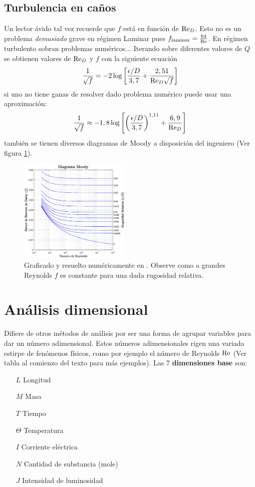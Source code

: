 \subsection{Turbulencia en caños}
Un lector ávido tal vez recuerde que $f$ está en función de $\textrm{Re}_D$. Esto no es un problema \textit{demasiado} grave en régimen Laminar pues $f_{\textrm{laminar}}=\frac{64}{\textrm{Re}}$. En régimen turbulento sobran problemas numéricos...  Iterando sobre diferentes valores de $Q$ se obtienen valores de $\textrm{Re}_D$ y $f$ con la siguiente ecuación
\begin{equation} \label{eq:darcyExact}
    \frac{1}{\sqrt{f}}=-2\log \left[ \frac{\epsilon/D}{3,7}+\frac{2,51}{\textrm{Re}_D \sqrt{f}} \right]
\end{equation}
si uno no tiene ganas de resolver dado problema numérico puede usar una aproximación:
\[
\frac{1}{\sqrt{f}}\approx -1,8\log \left[ \left(\frac{\epsilon/D}{3,7}\right)^{1,11}+\frac{6,9}{\textrm{Re}_D}\right]
\]
también se tienen diversos diagramas de Moody a disposición del ingeniero (Ver figura \ref{fig:moodydiagram}).
\begin{figure}[htb!]
    \centering
    \includegraphics[width=0.475\textwidth]{fig/moodydiag.eps}
    \caption{Graficado y resuelto numéricamente en \Matlab. Observe como a grandes Reynolds $f$ es constante para una dada rugosidad relativa.}
    \label{fig:moodydiagram}
\end{figure}


\section{Análisis dimensional}
Difiere de otros métodos de análisis por ser una forma de agrupar variables para dar un número adimensional. Estos números adimensionales rigen una variada estirpe de fenómenos físicos, como por ejemplo el número de Reynolds $\textrm{Re}$ (Ver tabla al comienzo del texto para más ejemplos). Las 7 \textbf{dimensiones base} son:
\begin{itemize}
    \item[$L$] Longitud
    \item[$M$] Masa
    \item[$T$] Tiempo
    \item[$\Theta$] Temperatura
    \item[$I$] Corriente eléctrica
    \item[$N$] Cantidad de substancia (mole)
    \item[$J$] Intensidad de luminosidad
\end{itemize}

